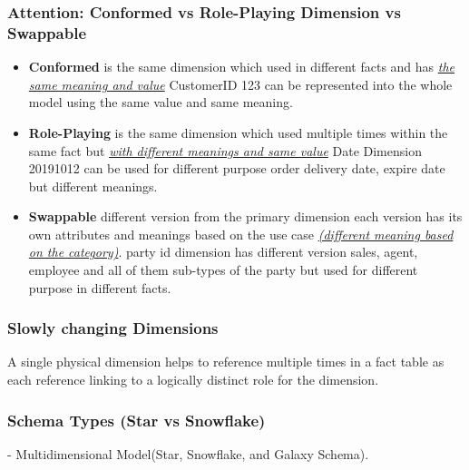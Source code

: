\begin{frame}
\frametitle{Attention: Conformed vs Role-Playing Dimension vs Swappable}
	\begin{itemize}[<+->]
		\item \textbf{Conformed} is the same dimension which used in different facts and has \textit{\underline{the same meaning and value}} \faEdit \space \faArrowCircleORight \space CustomerID 123 can be represented into the whole model using the same value and same meaning.
		\item \textbf{Role-Playing} is the same dimension which used multiple times within the same fact but \textit{\underline{with different meanings and same value}} \faEdit \space \faArrowCircleORight \space Date Dimension 20191012 can be used for different purpose order delivery date, expire date but different meanings.
		\item \textbf{Swappable} different version from the primary dimension each version has its own attributes and meanings based on the use case \textit{\underline{(different meaning based on the category)}}. \faEdit \space \faArrowCircleORight \space party id dimension has different version sales, agent, employee and all of them sub-types of the party but used for different purpose in different facts.
	\end{itemize}

\end{frame}
\begin{frame}
    \frametitle{Slowly changing Dimensions}
    \begin{description}[<+->]
        \item[Slowly changing Dimensions]    A single physical dimension helps to reference multiple times in a fact table as each reference linking to a logically distinct role for the dimension.
    \end{description}
\end{frame}
\begin{frame}
    \frametitle{Schema Types (Star vs Snowflake)}
    - Multidimensional Model(Star, Snowflake, and Galaxy Schema).\\

\end{frame}

